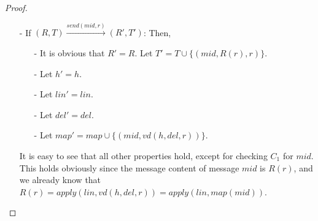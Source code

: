 {\begin {proof}
\begin{itemize}
    It is easy to see that all other properties hold, except for $h'$ being distributed linearizable w.r.t $\mathit{spec}$ with $\mathit{lin}'$ the linearization. Let us prove that $h'$ is distributed linearizable w.r.t $\mathit{spec}$ and $\mathit{lin}'$ is a linearization. It is easy to see that only operation $i$ need to be checked.

    It is easy to see that $\mathit{vd}(h,\mathit{del},r) = \mathit{vis}^{-1}(i)$. Similarly as the case of $(R,T) {\xrightarrow{\mathit{do}(\mathit{inc},r)}} (R',T')$, we can prove that $R(r) = (P',N')$, where for each replica $r'$, $P'[r'] = \vert \{ j \in \mathit{vd}(h,\mathit{del},r) \uparrow_{\mathit{inc}}$ and $j$ is of replica $r \} \vert = \vert \{ j \in \mathit{vis}^{-1}(i) \uparrow_{\mathit{inc}}$ and $j$ is of replica $r \} \vert$ and $N'[r'] = \vert \{ j \in \mathit{vd}(h,\mathit{del},r) \uparrow_{\mathit{dec}}$ and $j$ is of replica $r \} \vert = \vert \{ j \in \mathit{vis}^{-1}(i) \uparrow_{\mathit{dec}}$ and $j$ is of replica $r \} \vert$. Since $k = \Sigma_{r'} P[r'] - \Sigma_{r'} N'[r']$, $k$ is obtained by minus the number of all visible $\mathit{dec}$ of $i$ from the number of all visible $\mathit{inc}$ of $i$. Therefore, we can see that $((\mathit{read}() \Rightarrow k,i,\mathit{obj}), \mathit{vd}(h,\mathit{del},r) )$ of $\mathit{lin}'$ is ``correct''. Then, $h'$ is distributed linearizable w.r.t $\mathit{spec}$ and $\mathit{lin}'$ is a linearization.

\item[-] If $(R,T) {\xrightarrow{\mathit{send}(\mathit{mid},r)}} (R',T')$: Then,

    \begin{itemize}
    \setlength{\itemsep}{0.5pt}
    \item[-] It is obvious that $R' = R$. Let $T' = T \cup \{ (\mathit{mid},R(r),r) \}$.

    \item[-] Let $h' = h$.

    \item[-] Let $\mathit{lin}' = \mathit{lin}$.

    \item[-] Let $\mathit{del}' = \mathit{del}$.

    \item[-] Let $\mathit{map}' = \mathit{map} \cup \{ (\mathit{mid},\mathit{vd}(h,\mathit{del},r)) \}$.
    \end{itemize}

    It is easy to see that all other properties hold, except for checking $C_1$ for $\mathit{mid}$. This holds obviously since the message content of message $\mathit{mid}$ is $R(r)$, and we already know that $R(r) = \mathit{apply}(\mathit{lin},\mathit{vd}(h,\mathit{del},r)) = \mathit{apply}(\mathit{lin},\mathit{map}(\mathit{mid}))$.


\end{itemize}
\end{proof}}
